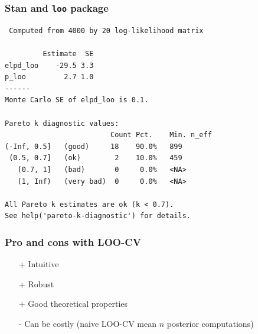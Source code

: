 \documentclass[10pt]{beamer}
\begin{document}
\begin{frame}[fragile]

\frametitle{Stan and {\tt loo} package}

  {\scriptsize
\begin{lstlisting}
 Computed from 4000 by 20 log-likelihood matrix

         Estimate  SE
elpd_loo    -29.5 3.3
p_loo         2.7 1.0
------
Monte Carlo SE of elpd_loo is 0.1.

Pareto k diagnostic values:
                         Count Pct.    Min. n_eff
(-Inf, 0.5]   (good)     18    90.0%   899
 (0.5, 0.7]   (ok)        2    10.0%   459
   (0.7, 1]   (bad)       0     0.0%   <NA>
   (1, Inf)   (very bad)  0     0.0%   <NA>

All Pareto k estimates are ok (k < 0.7).
See help('pareto-k-diagnostic') for details.
\end{lstlisting}
}

\end{frame}


\begin{frame}

\frametitle{Pro and cons with LOO-CV}

  \begin{enumerate}
  \item[+] Intuitive
  \item[+] Robust
  \item[+] Good theoretical properties
  \pause
  \item[-] Can be costly (naive LOO-CV mean $n$ posterior computations)
  \end{enumerate}

\end{frame}
\end{document}
